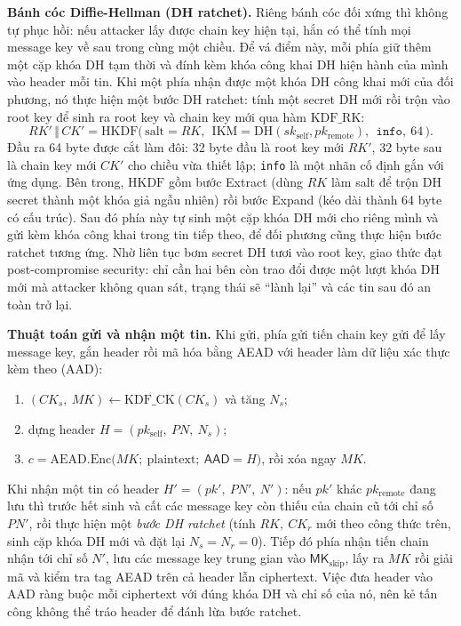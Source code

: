 \textbf{Bánh cóc Diffie-Hellman (DH ratchet).} Riêng bánh cóc đối xứng thì không tự phục hồi: nếu attacker lấy được chain key hiện tại, hắn có thể tính mọi message key về sau trong cùng một chiều. Để vá điểm này, mỗi phía giữ thêm một cặp khóa DH tạm thời và đính kèm khóa công khai DH hiện hành của mình vào header mỗi tin. Khi một phía nhận được một khóa DH công khai mới của đối phương, nó thực hiện một bước DH ratchet: tính một secret DH mới rồi trộn vào root key để sinh ra root key và chain key mới qua hàm $\mathrm{KDF\_RK}$:
\[
  RK' \,\Vert\, CK' = \mathrm{HKDF}\bigl(\,\text{salt}=RK,\ \ \text{IKM}=\mathrm{DH}(sk_{\text{self}}, pk_{\text{remote}}),\ \ \texttt{info},\ 64\,\bigr).
\]
Đầu ra 64 byte được cắt làm đôi: 32 byte đầu là root key mới $RK'$, 32 byte sau là chain key mới $CK'$ cho chiều vừa thiết lập; \texttt{info} là một nhãn cố định gắn với ứng dụng. Bên trong, $\mathrm{HKDF}$ gồm bước Extract (dùng $RK$ làm salt để trộn DH secret thành một khóa giả ngẫu nhiên) rồi bước Expand (kéo dài thành 64 byte có cấu trúc). Sau đó phía này tự sinh một cặp khóa DH mới cho riêng mình và gửi kèm khóa công khai trong tin tiếp theo, để đối phương cũng thực hiện bước ratchet tương ứng. Nhờ liên tục bơm secret DH tươi vào root key, giao thức đạt post-compromise security: chỉ cần hai bên còn trao đổi được một lượt khóa DH mới mà attacker không quan sát, trạng thái sẽ ``lành lại'' và các tin sau đó an toàn trở lại.

\textbf{Thuật toán gửi và nhận một tin.} Khi gửi, phía gửi tiến chain key gửi để lấy message key, gắn header rồi mã hóa bằng AEAD với header làm dữ liệu xác thực kèm theo (AAD):
\begin{enumerate}
  \item $(CK_s,\ MK) \leftarrow \mathrm{KDF\_CK}(CK_s)$ và tăng $N_s$;
  \item dựng header $H = (pk_{\text{self}},\ PN,\ N_s)$;
  \item $c = \mathrm{AEAD.Enc}\bigl(MK;\ \text{plaintext};\ \mathsf{AAD}=H\bigr)$, rồi xóa ngay $MK$.
\end{enumerate}
Khi nhận một tin có header $H' = (pk',\ PN',\ N')$: nếu $pk'$ khác $pk_{\text{remote}}$ đang lưu thì trước hết sinh và cất các message key còn thiếu của chain cũ tới chỉ số $PN'$, rồi thực hiện một \emph{bước DH ratchet} (tính $RK,\ CK_r$ mới theo công thức trên, sinh cặp khóa DH mới và đặt lại $N_s=N_r=0$). Tiếp đó phía nhận tiến chain nhận tới chỉ số $N'$, lưu các message key trung gian vào $\mathsf{MK}_{\text{skip}}$, lấy ra $MK$ rồi giải mã và kiểm tra tag AEAD trên cả header lẫn ciphertext. Việc đưa header vào AAD ràng buộc mỗi ciphertext với đúng khóa DH và chỉ số của nó, nên kẻ tấn công không thể tráo header để đánh lừa bước ratchet.

